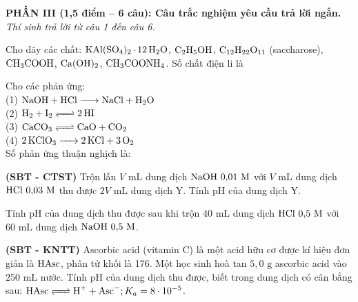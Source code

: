 \documentclass[12pt,a4paper]{article}
\begin{document}
\bigskip
\noindent
\textbf{PHẦN III (1,5 điểm -- 6 câu): Câu trắc nghiệm yêu cầu trả lời ngắn.}\\
\textit{Thí sinh trả lời từ câu 1 đến câu 6.}

\begin{ex}
Cho dãy các chất: $\ce{KAl(SO4)2.12H2O}$, $\ce{C2H5OH}$, $\ce{C12H22O11}$ (saccharose), $\ce{CH3COOH}$, $\ce{Ca(OH)2}$, $\ce{CH3COONH4}$. Số chất điện li là

\vspace{1.2cm}

\end{ex}

\begin{ex}
Cho các phản ứng:\\
(1) $\ce{NaOH + HCl -> NaCl + H2O}$\\
(2) $\ce{H2 + I2 <=> 2HI}$\\
(3) $\ce{CaCO3 <=> CaO + CO2}$\\
(4) $\ce{2KClO3 -> 2KCl + 3O2}$\\
Số phản ứng thuận nghịch là:

\vspace{1.2cm}

\end{ex}

\begin{ex}
\textbf{(SBT - CTST)} Trộn lẫn $V\text{ mL}$ dung dịch $\ce{NaOH}\ 0{,}01\text{ M}$ với $V\text{ mL}$ dung dịch $\ce{HCl}\ 0{,}03\text{ M}$ thu được $2V\text{ mL}$ dung dịch Y. Tính pH của dung dịch Y.

\vspace{1.2cm}

\end{ex}

\begin{ex}
Tính pH của dung dịch thu được sau khi trộn $40\text{ mL}$ dung dịch $\ce{HCl}\ 0{,}5\text{ M}$ với $60\text{ mL}$ dung dịch $\ce{NaOH}\ 0{,}5\text{ M}$.

\vspace{1.2cm}

\end{ex}

\begin{ex}
\textbf{(SBT - KNTT)} Ascorbic acid (vitamin C) là một acid hữu cơ được kí hiệu đơn giản là $\ce{HAsc}$, phân tử khối là 176. Một học sinh hoà tan $5{,}0\text{ g}$ ascorbic acid vào $250\text{ mL}$ nước. Tính pH của dung dịch thu được, biết trong dung dịch có cân bằng sau: $\ce{HAsc <=> H+ + Asc-}; K_a = 8 \cdot 10^{-5}$.

\vspace{1.2cm}

\end{ex}
\end{document}
